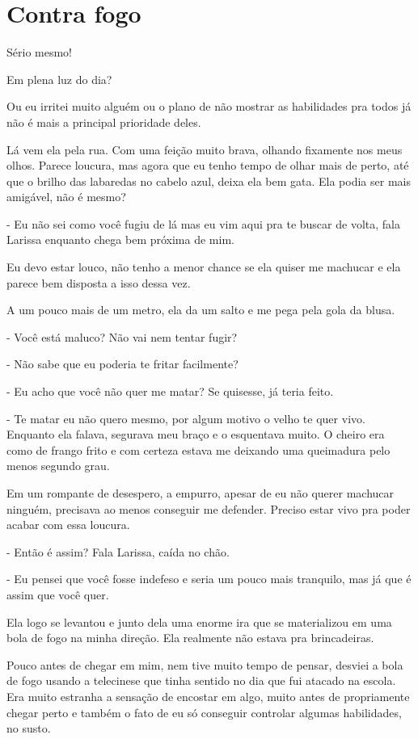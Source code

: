 \chapter{Contra fogo}
Sério mesmo!

Em plena luz do dia? 

Ou eu irritei muito alguém ou o plano de não mostrar as habilidades pra todos já não é mais a principal prioridade deles.

Lá vem ela pela rua. Com uma feição muito brava, olhando fixamente nos meus olhos. Parece loucura, mas agora que eu tenho tempo de olhar mais de perto, até que o brilho das labaredas no cabelo azul, deixa ela bem gata. Ela podia ser mais amigável, não é mesmo?

- Eu não sei como você fugiu de lá mas eu vim aqui pra te buscar de volta, fala Larissa enquanto chega bem próxima de mim.

Eu devo estar louco, não tenho a menor chance se ela quiser me machucar e ela parece bem disposta a isso dessa vez.

A um pouco mais de um metro, ela da um salto e me pega pela gola da blusa.

- Você está maluco? Não vai nem tentar fugir?

- Não sabe que eu poderia te fritar facilmente?

- Eu acho que você não quer me matar? Se quisesse, já teria feito.

- Te matar eu não quero mesmo, por algum motivo o velho te quer vivo. Enquanto ela falava, segurava meu braço e o esquentava muito. O cheiro era como de frango frito e com certeza estava me deixando uma queimadura pelo menos segundo grau.

Em um rompante de desespero, a empurro, apesar de eu não querer machucar ninguém, precisava ao menos conseguir me defender. Preciso estar vivo pra poder acabar com essa loucura.

- Então é assim? Fala Larissa, caída no chão.

- Eu pensei que você fosse indefeso e seria um pouco mais tranquilo, mas já que é assim que você quer.

Ela logo se levantou e junto dela uma enorme ira que se materializou em uma bola de fogo na minha direção. Ela realmente não estava pra brincadeiras.

Pouco antes de chegar em mim, nem tive muito tempo de pensar, desviei a bola de fogo usando a telecinese que tinha sentido no dia que fui atacado na escola. Era muito estranha a sensação de encostar em algo, muito antes de propriamente chegar perto e também o fato de eu só conseguir controlar algumas habilidades, no susto.

